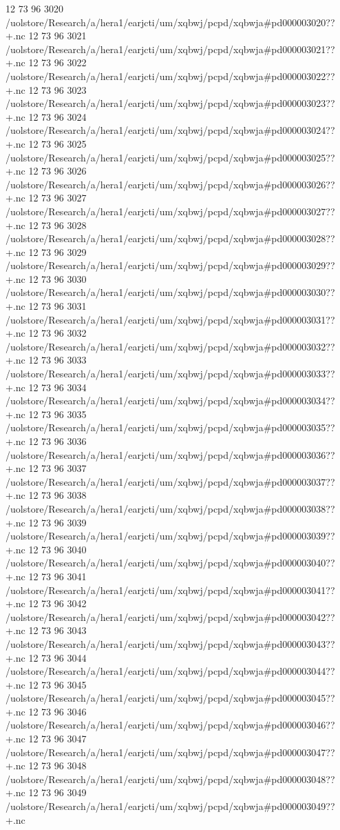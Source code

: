 12 73 96
3020
/uolstore/Research/a/hera1/earjcti/um/xqbwj/pcpd/xqbwja#pd000003020??+.nc
12 73 96
3021
/uolstore/Research/a/hera1/earjcti/um/xqbwj/pcpd/xqbwja#pd000003021??+.nc
12 73 96
3022
/uolstore/Research/a/hera1/earjcti/um/xqbwj/pcpd/xqbwja#pd000003022??+.nc
12 73 96
3023
/uolstore/Research/a/hera1/earjcti/um/xqbwj/pcpd/xqbwja#pd000003023??+.nc
12 73 96
3024
/uolstore/Research/a/hera1/earjcti/um/xqbwj/pcpd/xqbwja#pd000003024??+.nc
12 73 96
3025
/uolstore/Research/a/hera1/earjcti/um/xqbwj/pcpd/xqbwja#pd000003025??+.nc
12 73 96
3026
/uolstore/Research/a/hera1/earjcti/um/xqbwj/pcpd/xqbwja#pd000003026??+.nc
12 73 96
3027
/uolstore/Research/a/hera1/earjcti/um/xqbwj/pcpd/xqbwja#pd000003027??+.nc
12 73 96
3028
/uolstore/Research/a/hera1/earjcti/um/xqbwj/pcpd/xqbwja#pd000003028??+.nc
12 73 96
3029
/uolstore/Research/a/hera1/earjcti/um/xqbwj/pcpd/xqbwja#pd000003029??+.nc
12 73 96
3030
/uolstore/Research/a/hera1/earjcti/um/xqbwj/pcpd/xqbwja#pd000003030??+.nc
12 73 96
3031
/uolstore/Research/a/hera1/earjcti/um/xqbwj/pcpd/xqbwja#pd000003031??+.nc
12 73 96
3032
/uolstore/Research/a/hera1/earjcti/um/xqbwj/pcpd/xqbwja#pd000003032??+.nc
12 73 96
3033
/uolstore/Research/a/hera1/earjcti/um/xqbwj/pcpd/xqbwja#pd000003033??+.nc
12 73 96
3034
/uolstore/Research/a/hera1/earjcti/um/xqbwj/pcpd/xqbwja#pd000003034??+.nc
12 73 96
3035
/uolstore/Research/a/hera1/earjcti/um/xqbwj/pcpd/xqbwja#pd000003035??+.nc
12 73 96
3036
/uolstore/Research/a/hera1/earjcti/um/xqbwj/pcpd/xqbwja#pd000003036??+.nc
12 73 96
3037
/uolstore/Research/a/hera1/earjcti/um/xqbwj/pcpd/xqbwja#pd000003037??+.nc
12 73 96
3038
/uolstore/Research/a/hera1/earjcti/um/xqbwj/pcpd/xqbwja#pd000003038??+.nc
12 73 96
3039
/uolstore/Research/a/hera1/earjcti/um/xqbwj/pcpd/xqbwja#pd000003039??+.nc
12 73 96
3040
/uolstore/Research/a/hera1/earjcti/um/xqbwj/pcpd/xqbwja#pd000003040??+.nc
12 73 96
3041
/uolstore/Research/a/hera1/earjcti/um/xqbwj/pcpd/xqbwja#pd000003041??+.nc
12 73 96
3042
/uolstore/Research/a/hera1/earjcti/um/xqbwj/pcpd/xqbwja#pd000003042??+.nc
12 73 96
3043
/uolstore/Research/a/hera1/earjcti/um/xqbwj/pcpd/xqbwja#pd000003043??+.nc
12 73 96
3044
/uolstore/Research/a/hera1/earjcti/um/xqbwj/pcpd/xqbwja#pd000003044??+.nc
12 73 96
3045
/uolstore/Research/a/hera1/earjcti/um/xqbwj/pcpd/xqbwja#pd000003045??+.nc
12 73 96
3046
/uolstore/Research/a/hera1/earjcti/um/xqbwj/pcpd/xqbwja#pd000003046??+.nc
12 73 96
3047
/uolstore/Research/a/hera1/earjcti/um/xqbwj/pcpd/xqbwja#pd000003047??+.nc
12 73 96
3048
/uolstore/Research/a/hera1/earjcti/um/xqbwj/pcpd/xqbwja#pd000003048??+.nc
12 73 96
3049
/uolstore/Research/a/hera1/earjcti/um/xqbwj/pcpd/xqbwja#pd000003049??+.nc
